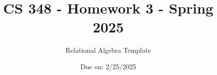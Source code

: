 
\documentclass[12pt]{exam}
\usepackage[utf8]{inputenc}

\usepackage[margin=1in]{geometry}
\usepackage{amsmath,amssymb}
\usepackage{multicol}
\usepackage{listings} 
\usepackage{enumerate}
\usepackage{blindtext}
\usepackage{scrextend}
\usepackage{graphicx}
\usepackage{comment}
\usepackage{xcolor}


\def\ojoin{\setbox0=\hbox{$\bowtie$}%
  \rule[-.02ex]{.25em}{.4pt}\llap{\rule[\ht0]{.25em}{.4pt}}}
\def\leftouterjoin{\mathbin{\ojoin\mkern-5.8mu\bowtie}}
\def\rightouterjoin{\mathbin{\bowtie\mkern-5.8mu\ojoin}}
\def\fullouterjoin{\mathbin{\ojoin\mkern-5.8mu\bowtie\mkern-5.8mu\ojoin}}

\newcommand{\chenzhe}[1]{{\it\small\textcolor{purple}{[ {#1}\ --chenzhe ]}}}

\renewcommand{\choiceshook}{%
    \setlength{\leftmargin}{15pt}%
}
\title{CS 348 - Homework 3 - Spring 2025}
\author{Relational Algebra Template}
\date{Due on: 2/25/2025}


\sloppy
\maketitle
\noindent
Here is some sample Latex code for you in order to get familiar with the Autograding Syntax. Below is the template on how you should write your answers in Latex.\\
$a \leftarrow {} \times {}$\\
$b \leftarrow \sigma_{\text{a.n\_neighbourhood\_id = a.p\_neighbourhood\_id}}(a)$\\
$c \leftarrow \sigma_{\text{b.n\_name = 'Harlem'}}(b)$\\
$d \leftarrow \pi_{\text{c.id, c.p\_name}}(c)$\\
$d$

